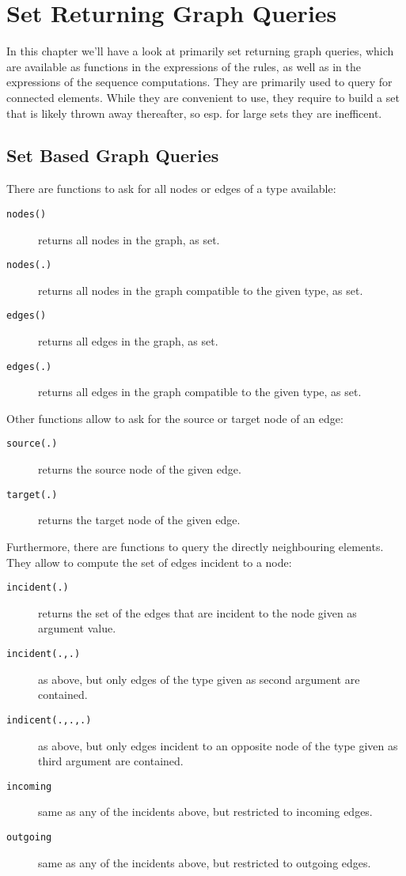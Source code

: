 \chapter{Set Returning Graph Queries}
\label{cha:setbasedgraph}

In this chapter we'll have a look at primarily set returning graph queries, which are available as functions in the expressions of the rules, as well as in the expressions of the sequence computations.
They are primarily used to query for connected elements.
While they are convenient to use, they require to build a set that is likely thrown away thereafter, so esp. for large sets they are inefficent.

\section{Set Based Graph Queries}\label{neighbouringelementsfunctions}

There are functions to ask for all nodes or edges of a type available: 
\begin{description}
\item[\texttt{nodes()}] returns all nodes in the graph, as set.
\item[\texttt{nodes(.)}] returns all nodes in the graph compatible to the given type, as set.
\item[\texttt{edges()}] returns all edges in the graph, as set.
\item[\texttt{edges(.)}] returns all edges in the graph compatible to the given type, as set.
\end{description}

Other functions allow to ask for the source or target node of an edge: 

\begin{description}
\item[\texttt{source(.)}] returns the source node of the given edge.
\item[\texttt{target(.)}] returns the target node of the given edge.
\end{description}

Furthermore, there are functions to query the directly neighbouring elements.
They allow to compute the set of edges incident to a node:

\begin{description}
\item[\texttt{incident(.)}] returns the set of the edges that are incident to the node given as argument value.
\item[\texttt{incident(.,.)}] as above, but only edges of the type given as second argument are contained.
\item[\texttt{indicent(.,.,.)}] as above, but only edges incident to an opposite node of the type given as third argument are contained.
\item[\texttt{incoming}] same as any of the incidents above, but restricted to incoming edges.
\item[\texttt{outgoing}] same as any of the incidents above, but restricted to outgoing edges.
\end{description}


